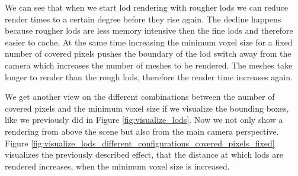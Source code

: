 We can see that when we start \ac{lod} rendering with rougher \acsp{lod} we can reduce render times to a certain degree before they rise again.
The decline happens because rougher \acsp{lod} are less memory intensive then the fine \acsp{lod} and therefore easier to cache.
At the same time increasing the minimum voxel size for a fixed number of covered pixels pushes the boundary of the \ac{lod} switch away from the camera which increases the number of meshes to be rendered.
The meshes take longer to render than the rough \acsp{lod}, therefore the render time increases again.

We get another view on the different combinations between the number of covered pixels and the minimum voxel size if we visualize the bounding boxes, like we previously did in Figure \ref{fig:visualize_lods}.
Now we not only show a rendering from above the scene but also from the main camera perspective.
Figure \ref{fig:visualize_lods_different_configurations_covered_pixels_fixed} visualizes the previously described effect, that the distance at which \acsp{lod} are rendered increases, when the minimum voxel size is increased.
